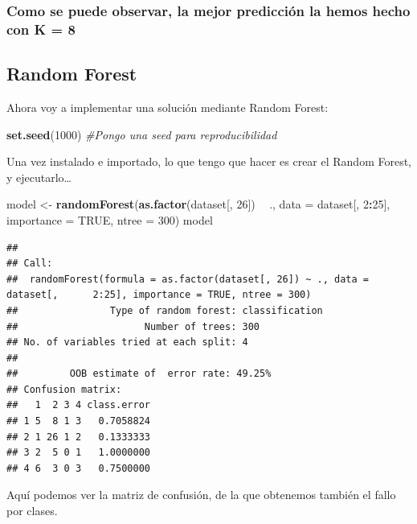 \documentclass[]{article}
\newenvironment{Shaded}{\begin{snugshade}}{\end{snugshade}}
\newcommand{\KeywordTok}[1]{\textcolor[rgb]{0.13,0.29,0.53}{\textbf{#1}}}
\newcommand{\DataTypeTok}[1]{\textcolor[rgb]{0.13,0.29,0.53}{#1}}
\newcommand{\DecValTok}[1]{\textcolor[rgb]{0.00,0.00,0.81}{#1}}
\newcommand{\StringTok}[1]{\textcolor[rgb]{0.31,0.60,0.02}{#1}}
\newcommand{\CommentTok}[1]{\textcolor[rgb]{0.56,0.35,0.01}{\textit{#1}}}
\newcommand{\OtherTok}[1]{\textcolor[rgb]{0.56,0.35,0.01}{#1}}
\newcommand{\OperatorTok}[1]{\textcolor[rgb]{0.81,0.36,0.00}{\textbf{#1}}}
\newcommand{\NormalTok}[1]{#1}
\begin{document}
\subsubsection{Como se puede observar, la mejor predicción la hemos
hecho con K =
8}\label{como-se-puede-observar-la-mejor-prediccion-la-hemos-hecho-con-k-8}

\subsection{Random Forest}\label{random-forest}

Ahora voy a implementar una solución mediante Random Forest:

\begin{Shaded}
\begin{Highlighting}[]
\KeywordTok{set.seed}\NormalTok{(}\DecValTok{1000}\NormalTok{) }\CommentTok{#Pongo una seed para reproducibilidad}
\end{Highlighting}
\end{Shaded}

Una vez instalado e importado, lo que tengo que hacer es crear el Random
Forest, y ejecutarlo\ldots{}

\begin{Shaded}
\begin{Highlighting}[]
\NormalTok{model <-}\StringTok{ }\KeywordTok{randomForest}\NormalTok{(}\KeywordTok{as.factor}\NormalTok{(dataset[, }\DecValTok{26}\NormalTok{]) }\OperatorTok{~}\StringTok{ }\NormalTok{., }\DataTypeTok{data =}\NormalTok{ dataset[, }\DecValTok{2}\OperatorTok{:}\DecValTok{25}\NormalTok{], }\DataTypeTok{importance =} \OtherTok{TRUE}\NormalTok{, }\DataTypeTok{ntree =} \DecValTok{300}\NormalTok{)}
\NormalTok{model}
\end{Highlighting}
\end{Shaded}

\begin{verbatim}
## 
## Call:
##  randomForest(formula = as.factor(dataset[, 26]) ~ ., data = dataset[,      2:25], importance = TRUE, ntree = 300) 
##                Type of random forest: classification
##                      Number of trees: 300
## No. of variables tried at each split: 4
## 
##         OOB estimate of  error rate: 49.25%
## Confusion matrix:
##   1  2 3 4 class.error
## 1 5  8 1 3   0.7058824
## 2 1 26 1 2   0.1333333
## 3 2  5 0 1   1.0000000
## 4 6  3 0 3   0.7500000
\end{verbatim}

Aquí podemos ver la matriz de confusión, de la que obtenemos también el
fallo por clases.
\end{document}
